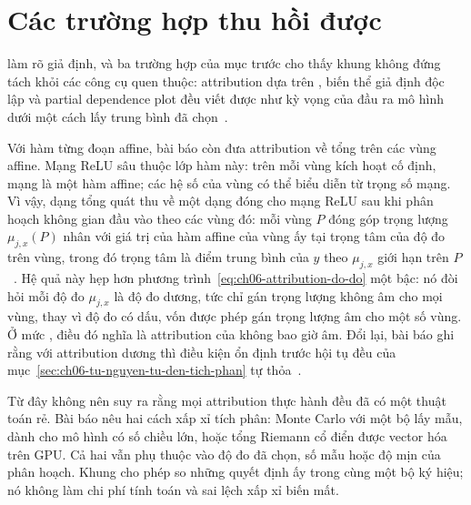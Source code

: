 \section{Các trường hợp thu hồi được}
\label{sec:ch06-thu-hoi}

%
%
 làm rõ giả định, và ba trường hợp của mục trước cho thấy
khung không đứng tách khỏi các công cụ quen thuộc: attribution dựa trên
, biến thể giả định độc lập và partial
dependence plot đều viết được như kỳ vọng của đầu ra mô hình dưới một cách lấy
trung bình đã chọn~\autocite{p17firstprinciples}.

Với hàm từng đoạn affine, bài báo còn đưa attribution về tổng trên các vùng
affine. Mạng ReLU sâu thuộc lớp hàm này: trên mỗi vùng kích hoạt cố định,
mạng là một hàm affine; các hệ số của vùng có thể biểu diễn từ trọng số mạng.
Vì vậy, dạng tổng quát thu về một dạng đóng cho mạng ReLU sau khi phân hoạch
không gian đầu vào theo các vùng đó: mỗi vùng $P$ đóng góp trọng lượng
$\mu_{j,x}(P)$ nhân với giá trị của hàm affine của vùng ấy tại trọng tâm của
độ đo trên vùng, trong đó trọng tâm là điểm trung bình của $y$ theo
$\mu_{j,x}$ giới hạn trên $P$~\autocite{p17firstprinciples}. Hệ quả này hẹp hơn phương
trình~\ref{eq:ch06-attribution-do-do} một bậc: nó đòi hỏi mỗi độ đo $\mu_{j,x}$
là độ đo dương, tức chỉ gán trọng lượng không âm cho mọi vùng, thay vì độ đo có
dấu, vốn được phép gán trọng lượng âm cho một số vùng. Ở mức
, điều đó nghĩa là attribution
của  không bao giờ âm. Đổi lại, bài báo
ghi rằng với attribution dương thì điều kiện ổn định trước hội tụ đều của
mục~\ref{sec:ch06-tu-nguyen-tu-den-tich-phan} tự thỏa~\autocite{p17firstprinciples}.

Từ đây không nên suy ra rằng mọi attribution thực hành đều đã có một thuật
toán rẻ. Bài báo nêu hai cách xấp xỉ tích phân: Monte Carlo với một bộ lấy mẫu, dành
cho mô hình có số chiều lớn, hoặc tổng Riemann cổ điển được vector hóa trên
GPU. Cả hai vẫn phụ thuộc vào độ đo
đã chọn, số mẫu hoặc độ mịn của phân hoạch. Khung cho phép so những quyết định
ấy trong cùng một bộ ký hiệu; nó không làm chi phí tính toán và sai lệch xấp xỉ
biến mất.
